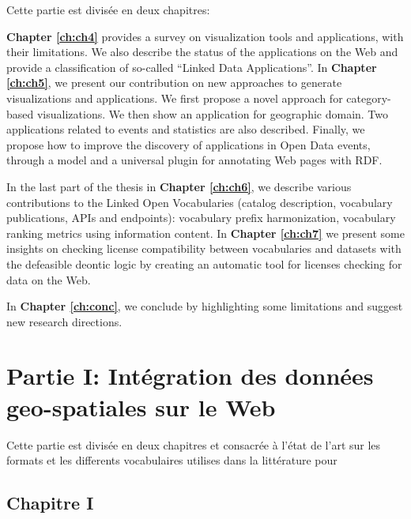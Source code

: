 \documentclass[a4paper,11pt,twoside]{report}
\begin{document}
 Cette partie est divisée en deux chapitres:
 
 
  \textbf{Chapter \ref{ch:ch4}} provides a survey on visualization tools and applications, with their limitations. We also describe the status of the applications on the Web and provide a classification of so-called ``Linked Data Applications''.
   In \textbf{Chapter \ref{ch:ch5}}, we present our contribution on new approaches to generate visualizations and applications. We first propose a novel approach for category-based visualizations. We then show an application for geographic domain. Two applications related to events and statistics are also described. Finally, we propose how to improve the discovery of applications in Open Data events, through a model and a universal plugin for annotating Web pages with RDF. 

 In the last part of the thesis in \textbf{Chapter \ref{ch:ch6}}, we describe various contributions to the Linked Open Vocabularies (catalog description, vocabulary publications, APIs and endpoints): vocabulary prefix harmonization, vocabulary ranking metrics using information content. 
  In \textbf{Chapter \ref{ch:ch7}} we present some insights on checking license compatibility between vocabularies and datasets with the defeasible deontic logic by creating an automatic tool for licenses checking for data on the Web. 


 In \textbf{Chapter \ref{ch:conc}}, we conclude by highlighting some limitations and suggest new research directions.


\chapter*{Partie I: Intégration des données geo-spatiales sur le Web}

Cette partie est divisée en deux chapitres et consacrée à l'état de l'art sur les formats et les differents vocabulaires utilises dans la littérature pour  

\section*{Chapitre I}
\end{document}
